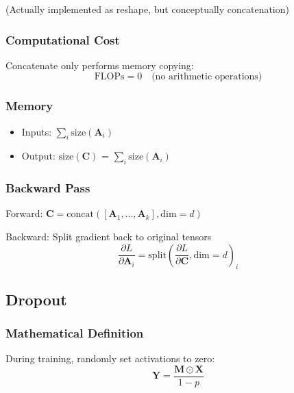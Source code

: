 \documentclass[10pt]{article}
\begin{document}
(Actually implemented as reshape, but conceptually concatenation)

\subsubsection{Computational Cost}

Concatenate only performs memory copying:
\begin{equation}
\text{FLOPs} = 0 \quad \text{(no arithmetic operations)}
\end{equation}

\subsubsection{Memory}

\begin{itemize}
  \item Inputs: $\sum_i \text{size}(\mathbf{A}_i)$
  \item Output: $\text{size}(\mathbf{C})$ = $\sum_i \text{size}(\mathbf{A}_i)$
\end{itemize}

\subsubsection{Backward Pass}

Forward: $\mathbf{C} = \text{concat}([\mathbf{A}_1, \ldots, \mathbf{A}_k], \text{dim}=d)$

Backward: Split gradient back to original tensors
\begin{equation}
\frac{\partial L}{\partial \mathbf{A}_i} = \text{split}\left(\frac{\partial L}{\partial \mathbf{C}}, \text{dim}=d\right)_i
\end{equation}

\subsection{Dropout}
\label{subsec:dropout}

\subsubsection{Mathematical Definition}

During training, randomly set activations to zero:
\begin{equation}
\mathbf{Y} = \frac{\mathbf{M} \odot \mathbf{X}}{1-p}
\end{equation}
\end{document}
